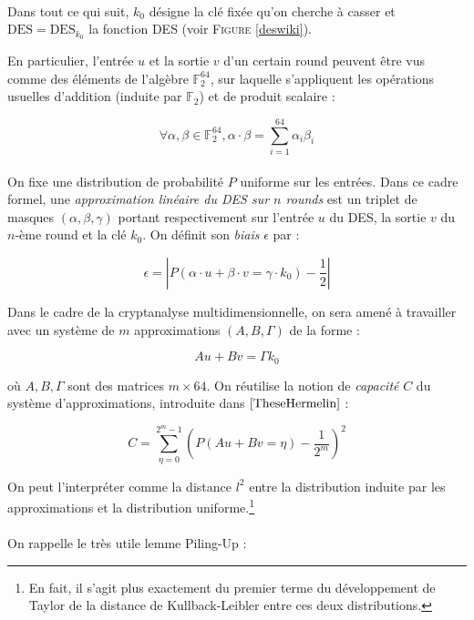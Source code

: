 \documentclass{scrartcl}
\begin{document}
\paragraph*{}
Dans tout ce qui suit, $k_0$ désigne la clé fixée qu'on cherche à casser et $\text{DES}=\text{DES}_{k_0}$
la fonction DES (voir \textsc{Figure} \ref{deswiki}).

En particulier, l'entrée $u$ et la sortie $v$ d'un certain round peuvent être vus comme des éléments de l'algèbre
$\mathbb{F}_2^{64}$, sur laquelle s'appliquent les opérations usuelles d'addition (induite par $\mathbb{F}_2$)
et de produit scalaire :

$$\forall \alpha, \beta \in \mathbb{F}_2^{64}, \alpha \cdot \beta = \sum_{i=1}^{64} \alpha_i \beta_i$$

\paragraph*{}
On fixe une distribution de probabilité $P$ uniforme sur les entrées. Dans ce cadre formel, une
\textit{approximation linéaire du DES sur $n$ rounds} est un triplet de masques $(\alpha, \beta, \gamma)$ portant
respectivement sur l'entrée $u$ du DES, la sortie $v$ du $n$-ème round et la clé $k_0$. On définit son \textit{biais} $\epsilon$ par :

$$\epsilon=\left|P(\alpha \cdot u + \beta \cdot v=\gamma \cdot k_0)-\frac{1}{2}\right|$$

Dans le cadre de la cryptanalyse multidimensionnelle, on sera amené à travailler avec un système de $m$ approximations $(A,B,\Gamma)$ de
la forme :

$$Au+Bv=\Gamma k_0$$

où $A,B,\Gamma$ sont des matrices $m\times 64$. On réutilise la notion de \textit{capacité} $C$ du système d'approximations, introduite dans
$\cite{TheseHermelin}$ :

$$C=\sum_{\eta=0}^{2^m-1}\left(P(Au+Bv=\eta)-\frac{1}{2^m}\right)^2$$

On peut l'interpréter comme la distance $l^2$ entre la distribution induite par les approximations et la distribution uniforme.\footnote{En fait,
il s'agit plus exactement du premier terme du développement de Taylor de la distance de Kullback-Leibler entre ces deux distributions.}

\paragraph*{}
On rappelle le très utile lemme Piling-Up :
\end{document}
